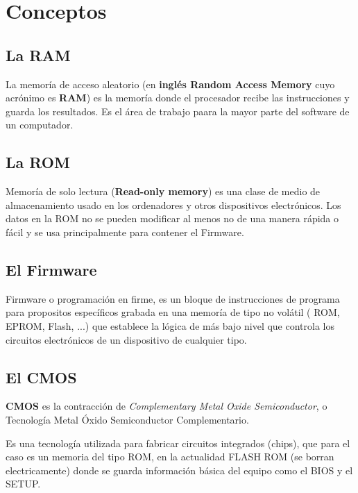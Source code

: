 \documentclass[12pt,oneside,a4paper]{article}
\begin{document}
\newpage

	\section{Conceptos}{\label{sec:conceptos}}

		\subsection{La RAM}{\label{sec:conceptos/RAM}}

		La memoría de acceso aleatorio (en {\bfseries inglés Random Access Memory} cuyo
		acrónimo es {\bfseries RAM}) es la memoría donde el procesador recibe las
		instrucciones y guarda los resultados. Es el área de trabajo paara la mayor
		parte del software de un computador.

		\subsection{La ROM}{\label{sec:conceptos/ROM}}

		Memoría de solo lectura ({\bfseries Read-only memory}) es una
		clase de medio de almacenamiento usado en los ordenadores y otros dispositivos
		electrónicos. Los
		datos en la ROM no se pueden modificar al menos no de una manera rápida o fácil
		y se usa principalmente para contener el Firmware.

		\subsection{El Firmware}{\label{sec:conceptos/firmware}}

		Firmware o programación en firme, es un bloque de instrucciones de
		programa para propositos específicos grabada en una memoría de tipo no volátil
		( ROM, EPROM, Flash, ...) que establece la lógica de más bajo nivel que
		controla los circuitos electrónicos de un dispositivo de cualquier tipo.

		\subsection{El CMOS}{\label{sec:conceptos/CMOS}}

		{\bf CMOS} es la contracción de {\em Complementary Metal Oxide Semiconductor}, o
		Tecnología Metal Óxido Semiconductor Complementario.
		
		Es una tecnología utilizada para fabricar circuitos integrados (chips), que
		para el caso es un memoria del tipo ROM, en la actualidad FLASH ROM (se
		borran electricamente) donde se guarda información básica del equipo como el
		BIOS y el SETUP. 
		
\end{document}
